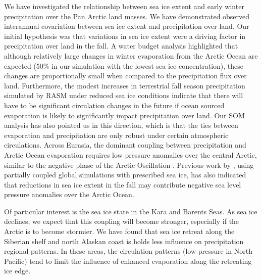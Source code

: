 We have investigated the relationship between sea ice extent and early winter precipitation over the Pan Arctic land masses.
We have demonstrated observed interannual covariation between sea ice extent and precipitation over land.
Our initial hypothesis was that variations in sea ice extent were a driving factor in precipitation over land in the fall.
A water budget analysis highlighted that although relatively large changes in winter evaporation from the Arctic Ocean are expected (50\% in our simulation with the lowest sea ice concentration), these changes are proportionally small when compared to the precipitation flux over land.
Furthermore, the modest increases in terrestrial fall season precipitation simulated by RASM under reduced sea ice conditions indicate that there will have to be significant circulation changes in the future if ocean sourced evaporation is likely to significantly impact precipitation over land.
Our SOM analysis has also pointed us in this direction, which is that the ties between evaporation and precipitation are only robust under certain atmospheric circulations.
Across Eurasia, the dominant coupling between precipitation and Arctic Ocean evaporation requires low pressure anomalies over the central Arctic, similar to the negative phase of the Arctic Oscillation \citep{Thompson_1998}.
Previous work by \citet{Cassano_2014}, using partially coupled global simulations with prescribed sea ice, has also indicated that reductions in sea ice extent in the fall may contribute negative sea level pressure anomalies over the Arctic Ocean.


Of particular interest is the sea ice state in the Kara and Barents Seas.
As sea ice declines, we expect that this coupling will become stronger, especially if the Arctic is to become stormier.
We have found that sea ice retreat along the Siberian shelf and north Alaskan coast is holds less influence on precipitation regional patterns.
In these areas, the circulation patterns (low pressure in North Pacific) tend to limit the influence of enhanced evaporation along the retreating ice edge.
